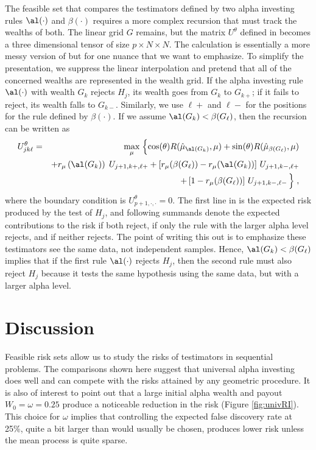 \documentclass[12pt]{article}
\begin{document}
 The feasible set that compares the testimators defined by two alpha investing
 rules $\al(\cdot)$ and $\beta(\cdot)$ requires a more complex recursion that
 must track the wealths of both.  The linear grid $G$ remains, but the matrix
 $U^\theta$ defined in  becomes a three dimensional tensor of size
 $p \times N \times N$.  The calculation is essentially a more messy version of
  but for one nuance that we want to emphasize.  To simplify the
 presentation, we suppress the linear interpolation and pretend that all of the
 concerned wealths are represented in the wealth grid.  If the alpha investing
 rule $\al(\cdot)$ with wealth $G_k$ rejects $H_j$, its wealth goes from $G_k$
 to $G_{k+}$; if it fails to reject, its wealth falls to $G_{k-}$.  Similarly,
 we use $\ell+$ and $\ell-$ for the positions for the rule defined by
 $\beta(\cdot)$.  If we assume $\al(G_k) < \beta(G_\ell)$, then the recursion
 can be written as
 \begin{eqnarray}
   U^\theta_{jk\ell} &=&  \max_\mu \;\Bigl\{
     \cos(\theta) R(\hat\mu_{\al(G_k)}, \mu) 
       + \sin(\theta) R(\hat\mu_{\beta(G_\ell)},\mu) \cr
     & & + r_\mu\left(\al(G_k)\right) \; U_{j+1,k+,\ell+} 
         + \left[ r_\mu(\beta(G_\ell)) - r_\mu(\al(G_k)) \right] \, U_{j+1,k-,\ell+} \cr
     & & + \left[1-r_\mu(\beta(G_\ell))\right] \, U_{j+1,k-,\ell-} \, \Bigr\}\;,
 \label{eq:Ujkl}
 \end{eqnarray}
 where the boundary condition is $U_{p+1,\cdot,\cdot}^\theta= 0$.  The first
 line in  is the expected risk produced by the test of $H_j$, and
 following summands denote the expected contributions to the risk if both
 reject, if only the rule with the larger alpha level rejects, and if neither
 rejects.  The point of writing this out is to emphasize these testimators see
 the same data, not independent samples.  Hence, $\al(G_k) < \beta(G_\ell)$
 implies that if the first rule $\al(\cdot)$ rejects $H_j$, then the second rule
 must also reject $H_j$ because it tests the same hypothesis using the same
 data, but with a larger alpha level.


\section{ Discussion }

 Feasible risk sets allow us to study the risks of testimators in sequential
 problems.  The comparisons shown here suggest that universal alpha investing
 does well and can compete with the risks attained by any geometric procedure.
  It is also of interest to point out that a large initial alpha wealth and
 payout $W_0 = \omega = 0.25$ produce a noticeable reduction in the risk (Figure
 \ref{fig:univRI}).  This choice for $\omega$ implies that controlling the
 expected false discovery rate at 25\%, quite a bit larger than would usually be
 chosen, produces lower risk unless the mean process is quite sparse.
\end{document}
